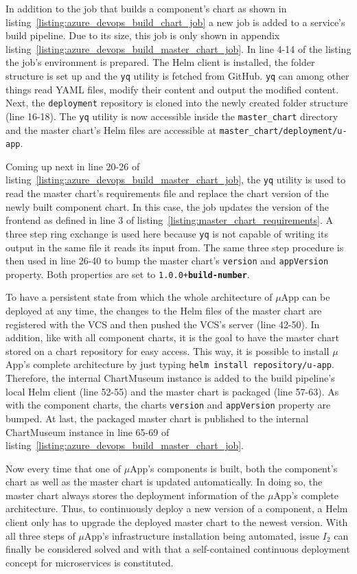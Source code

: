 In addition to the job that builds a component's chart as shown in
listing~\ref{listing:azure_devops_build_chart_job} a new job is added to a
service's build pipeline. Due to its size, this job is only shown in appendix
listing~\ref{listing:azure_devops_build_master_chart_job}. In line 4-14 of the
listing the job's environment is prepared. The Helm client is installed, the
folder structure is set up and the \texttt{yq} utility is fetched from GitHub.
\texttt{yq} can among other things read YAML files, modify their content and
output the modified content. Next, the \texttt{deployment} repository is cloned
into the newly created folder structure (line 16-18). The \texttt{yq} utility
is now accessible inside the \texttt{master_chart} directory and the master
chart's Helm files are accessible at \texttt{master_chart/deployment/u-app}.

Coming up next in line 20-26 of
listing~\ref{listing:azure_devops_build_master_chart_job}, the \texttt{yq}
utility is used to read the master chart's requirements file and replace the
chart version of the newly built component chart. In this case, the job updates
the version of the frontend as defined in line 3 of
listing~\ref{listing:master_chart_requirements}. A three step ring exchange is
used here because \texttt{yq} is not capable of writing its output in the same
file it reads its input from. The same three step procedure is then used in
line 26-40 to bump the master chart's \texttt{version} and \texttt{appVersion}
property. Both properties are set to \texttt{1.0.0+\textbf{build-number}}.

To have a persistent state from which the whole architecture of $\mu$App can be
deployed at any time, the changes to the Helm files of the master chart are
registered with the \ac{VCS} and then pushed the \ac{VCS}'s server (line
42-50). In addition, like with all component charts, it is the goal to have the
master chart stored on a chart repository for easy access. This way, it is
possible to install $\mu$App's complete architecture by just typing
\texttt{helm install repository/u-app}. Therefore, the internal ChartMuseum
instance is added to the build pipeline's local Helm client (line 52-55) and
the master chart is packaged (line 57-63). As with the component charts, the
charts \texttt{version} and \texttt{appVersion} property are bumped. At last,
the packaged master chart is published to the internal ChartMuseum instance in
line 65-69 of listing~\ref{listing:azure_devops_build_master_chart_job}.

Now every time that one of $\mu$App's components is built, both the component's
chart as well as the master chart is updated automatically. In doing so, the
master chart always stores the deployment information of the $\mu$App's
complete architecture. Thus, to continuously deploy a new version of a
component, a Helm client only has to upgrade the deployed master chart to the
newest version. With all three steps of $\mu$App's infrastructure installation
being automated, issue $I_2$ can finally be considered solved and with that a
self-contained continuous deployment concept for microservices is constituted.
